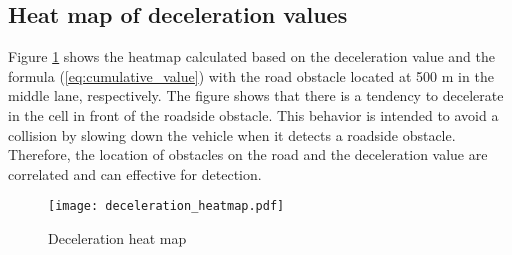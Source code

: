 \documentclass[paper]{ieice}
\begin{document}
\subsection{Heat map of deceleration values}
\label{seq:heat_map_of_deceleration_values}
%
Figure \ref{fig:deceleration_heatmap} shows the heatmap calculated based on the deceleration value and the formula (\ref{eq:cumulative_value}) with the road obstacle located at 500 m in the middle lane, respectively.
%
The figure shows that there is a tendency to decelerate in the cell in front of the roadside obstacle.
%
This behavior is intended to avoid a collision by slowing down the vehicle when it detects a roadside obstacle.
%
Therefore, the location of obstacles on the road and the deceleration value are correlated and can effective for detection.
%
\begin{figure}[tb]
  \centering
  \texttt{[image: deceleration\_heatmap.pdf]}
  \label{fig:deceleration_heatmap}
  \caption{Deceleration heat map}
\end{figure}
%


\begin{thebibliography}{99}%
\bibitem{}
\end{thebibliography}

\end{document}
